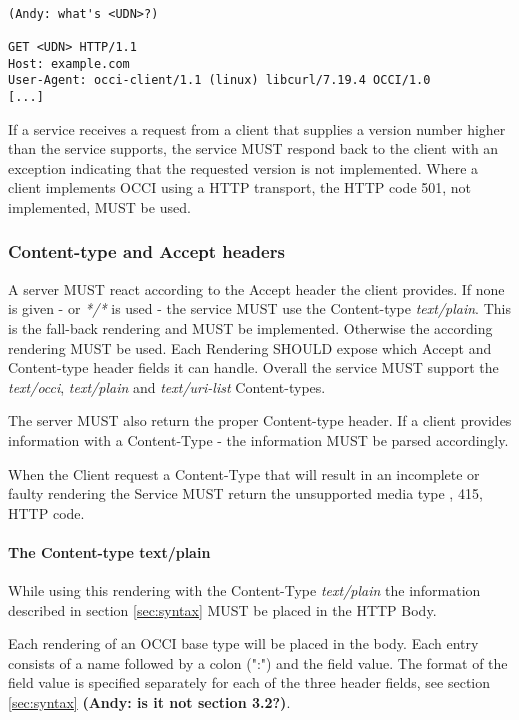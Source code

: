 \documentclass[10pt,a4paper]{article}
\begin{document}
\begin{verbatim}

(Andy: what's <UDN>?)

GET <UDN> HTTP/1.1
Host: example.com
User-Agent: occi-client/1.1 (linux) libcurl/7.19.4 OCCI/1.0
[...]
\end{verbatim}

If a service receives a request from a client that supplies a version
number higher than the service supports, the service MUST respond back
to the client with an exception indicating that the requested version
is not implemented. Where a client implements OCCI using a HTTP
transport, the HTTP code 501, not implemented, MUST be used.

\subsubsection{Content-type and Accept headers}
A server MUST react according to the Accept header the client
provides. If none is given - or \textit{*/*} is used - the service MUST
use the Content-type \emph{text/plain}. This is the fall-back
rendering and MUST be implemented. Otherwise the according rendering
MUST be used. Each Rendering SHOULD expose which Accept and
Content-type header fields it can handle. Overall the service MUST
support the \textit{text/occi}, \textit{text/plain} and
\textit{text/uri-list} Content-types.

The server MUST also return the proper Content-type header. If a
client provides information with a Content-Type - the information MUST
be parsed accordingly.

When the Client request a Content-Type that will result in an
incomplete or faulty rendering the Service MUST return the unsupported media type
, 415, HTTP code.

\paragraph{The Content-type text/plain}
While using this rendering with the Content-Type \textit{text/plain}
the information described in section \ref{sec:syntax} MUST be placed
in the HTTP Body.

Each rendering of an OCCI base type will be placed in the body. Each
entry consists of a name followed by a colon (":") and the field
value. The format of the field value is specified separately for each
of the three header fields, see section \ref{sec:syntax} \textbf{(Andy: is it not section 3.2?)}.
\end{document}

